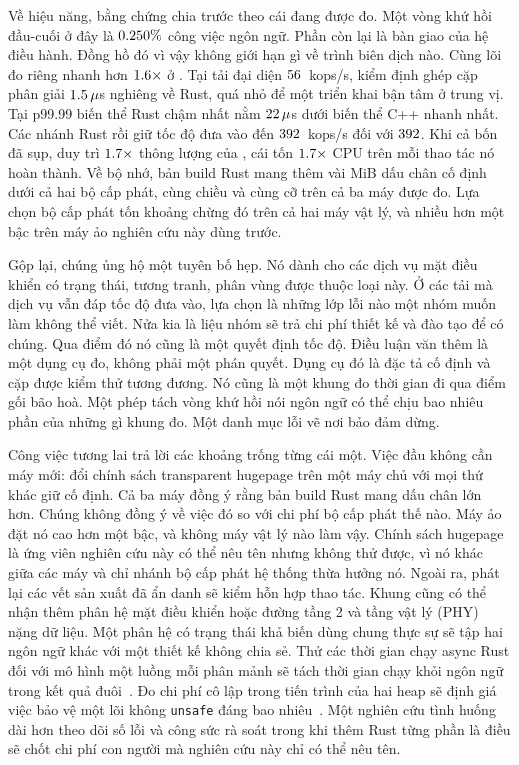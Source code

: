Về hiệu năng, bằng chứng chia trước theo cái đang được đo. Một vòng khứ hồi đầu-cuối ở đây là
$0.250\%$ công việc ngôn ngữ. Phần còn lại là bàn giao của hệ điều hành. Đồng hồ
đó vì vậy không giới hạn gì về trình biên dịch nào. Cùng lõi đo riêng nhanh hơn
$1.6\times$ ở \BudgetCoreFaster{}. Tại tải đại diện $56$~kops/s, kiểm
định ghép cặp phân giải $1.5\,\mu$s nghiêng về Rust, quá nhỏ để một triển khai bận
tâm ở trung vị. Tại p99.99 biến thể Rust chậm nhất nằm $22\,\mu$s dưới biến thể C++
nhanh nhất. Các nhánh Rust rồi giữ tốc độ đưa vào đến $392$~kops/s đối với
$392$. Khi cả bốn đã sụp, \OverloadSustainedFaster{} duy trì
$1.7\times$ thông lượng của \OverloadSustainedSlower{}, cái tốn
$1.7\times$ CPU trên mỗi thao tác nó hoàn thành. Về bộ nhớ, bản build Rust
mang thêm vài MiB dấu chân cố định dưới cả hai bộ cấp phát, cùng chiều và cùng cỡ trên cả ba máy
được đo. Lựa chọn bộ cấp phát tốn khoảng chừng đó trên cả hai máy vật lý, và nhiều hơn một bậc
trên máy ảo nghiên cứu này dùng trước.

Gộp lại, chúng ủng hộ một tuyên bố hẹp. Nó dành cho các dịch vụ mặt điều khiển có trạng thái,
tương tranh, phân vùng được thuộc loại này. Ở các tải mà dịch vụ vẫn đáp tốc độ đưa vào, lựa
chọn là những lớp lỗi nào một nhóm muốn làm không thể viết. Nửa kia là liệu nhóm sẽ trả chi phí
thiết kế và đào tạo để có chúng. Qua điểm đó nó cũng là một quyết định tốc độ. Điều luận văn
thêm là một dụng cụ đo, không phải một phán quyết. Dụng cụ đó là đặc tả cố định và cặp được kiểm
thử tương đương. Nó cũng là một khung đo thời gian đi qua điểm gối bão hoà. Một phép tách vòng khứ hồi nói
ngôn ngữ có thể chịu bao nhiêu phần của những gì khung đo. Một danh mục lỗi vẽ nơi bảo đảm dừng.

Công việc tương lai trả lời các khoảng trống từng cái một. Việc đầu không cần máy mới: đổi
chính sách transparent hugepage trên một máy chủ với mọi thứ khác giữ cố định. Cả ba máy đồng ý
rằng bản build Rust mang dấu chân lớn hơn. Chúng không đồng ý về việc đó so với chi phí bộ cấp
phát thế nào. Máy ảo đặt nó cao hơn một bậc, và không máy vật lý nào làm vậy. Chính sách
hugepage là ứng viên nghiên cứu này có thể nêu tên nhưng không thử được, vì nó khác giữa các máy
và chỉ nhánh bộ cấp phát hệ thống thừa hưởng nó. Ngoài ra, phát lại các vết sản xuất đã ẩn danh
sẽ kiểm hỗn hợp thao tác. Khung cũng có thể nhận thêm phân hệ mặt điều khiển hoặc đường tầng 2
và tầng vật lý (PHY) nặng dữ liệu. Một phân hệ có trạng thái khả biến dùng chung thực sự sẽ tập
hai ngôn ngữ khác với một thiết kế không chia sẻ. Thử các thời gian chạy async Rust đối với mô
hình một luồng mỗi phân mảnh sẽ tách thời gian chạy khỏi ngôn ngữ trong kết quả
đuôi~\cite{arvidsson2025async}. Đo chi phí cô lập trong tiến trình của hai heap sẽ định giá việc
bảo vệ một lõi không \texttt{unsafe} đáng
bao nhiêu~\cite{rivera2021galeed,kirth2022pkrusafe}. Một nghiên cứu tình huống dài hơn theo dõi
số lỗi và công sức rà soát trong khi thêm Rust từng phần là điều sẽ chốt chi phí con người mà
nghiên cứu này chỉ có thể nêu tên.
